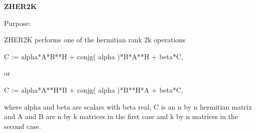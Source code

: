 {\bfseries Z\+H\+E\+R2\+K} 

\begin{DoxyParagraph}{Purpose\+: }
\begin{DoxyVerb} ZHER2K  performs one of the hermitian rank 2k operations

    C := alpha*A*B**H + conjg( alpha )*B*A**H + beta*C,

 or

    C := alpha*A**H*B + conjg( alpha )*B**H*A + beta*C,

 where  alpha and beta  are scalars with  beta  real,  C is an  n by n
 hermitian matrix and  A and B  are  n by k matrices in the first case
 and  k by n  matrices in the second case.\end{DoxyVerb}
 
\end{DoxyParagraph}

